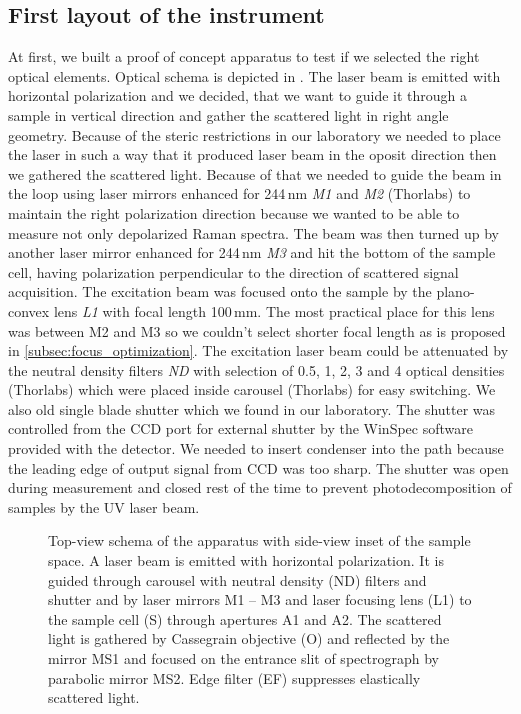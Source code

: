 \subsection{First layout of the instrument}

At first, we built a proof of concept apparatus to test if we selected the
right optical elements. Optical schema is depicted in
.
The laser beam is emitted with horizontal polarization and we decided, that we
want to guide it through a sample in vertical direction and gather the
scattered light in right angle geometry. Because of the steric restrictions in
our laboratory we needed to place the laser in such a way that it produced
laser beam in the oposit direction then we gathered the scattered light.
Because of that we needed to guide the beam in the loop using laser mirrors
enhanced for 244\,nm \emph{M1} and \emph{M2} (Thorlabs) to maintain the right
polarization direction because we wanted to be able to measure not only
depolarized Raman spectra. The beam was then turned up by another laser mirror
enhanced for 244\,nm \emph{M3} and hit the bottom of the sample cell, having
polarization perpendicular to the direction of scattered signal acquisition.
The excitation beam was focused onto the sample by the plano-convex lens
\emph{L1} with focal length 100\,mm. The most practical place for this lens
was between M2 and M3 so we couldn't select shorter focal length as is proposed
in \cref{subsec:focus_optimization}. The excitation laser beam could be attenuated by
the neutral density filters \emph{ND} with selection of 0.5, 1, 2, 3 and 4
optical densities (Thorlabs) which were placed inside carousel (Thorlabs) for
easy switching. We also old single blade shutter which we found in our
laboratory. The shutter was controlled from the CCD port for external shutter
by the WinSpec software provided with the detector. We needed to insert
condenser into the path because the leading edge of output signal from CCD was
too sharp. The shutter was open during measurement and closed rest of the time
to prevent photodecomposition of samples by the UV laser beam.

\begin{figure}
	\centering
	
	\caption{Top-view schema of the apparatus with side-view inset of the sample
		space. A laser beam is emitted with horizontal polarization. It is guided
		through carousel with neutral density (ND) filters and shutter and by laser
		mirrors M1 -- M3 and laser focusing lens (L1) to the sample cell (S)
		through apertures A1 and A2. The scattered light is gathered by Cassegrain
		objective (O) and reflected by the mirror MS1 and focused on the entrance
		slit of spectrograph by parabolic mirror MS2. Edge filter (EF) suppresses
		elastically scattered light.}
	\label{\figlabel{initial_layout:apparatus_schema}}
\end{figure}


